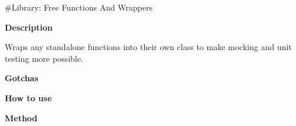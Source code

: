 \#\+Library\+: Free Functions And Wrappers

{\bfseries{Description}}

Wraps any standalone functions into their own class to make mocking and unit testing more possible.

{\bfseries{Gotchas}}

{\bfseries{How to use}}

{\bfseries{Method}} 